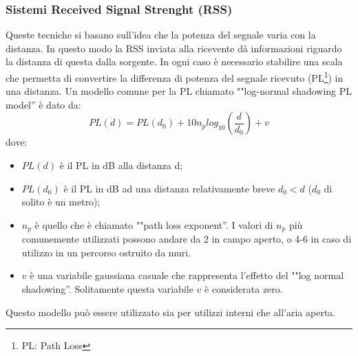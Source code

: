 \subsubsection{Sistemi Received Signal Strenght (RSS)}
Queste tecniche si basano sull'idea che la potenza del segnale varia con la distanza. In questo modo la RSS inviata alla ricevente dà informazioni riguardo la distanza di questa dalla sorgente. In ogni caso è necessario stabilire una scala che permetta di convertire la differenza di potenza del segnale ricevuto (PL\footnote{PL: Path Loss}) in una distanza. Un modello comune per la PL chiamato ""log-normal shadowing PL model'' è dato da:
 $$ PL\left(d\right) = PL\left(d_0\right) + 10n_plog_{10} \left( \frac{d}{d_0} \right) + v $$
dove:
\begin{itemize}
\item $ PL(d) $ è il PL in dB alla distanza d; 
\item $ PL(d_0) $ è il PL in dB ad una distanza relativamente breve $ d_0 < d $ ($ d_{0} $ di solito è un metro); 
\item $n_p$ è quello che è chiamato ""path loss exponent''. I valori di $n_p$ più comunemente utilizzati possono andare da 2 in campo aperto, o 4-6 in caso di utilizzo in un percorso ostruito da muri.
\item $v$ è una variabile gaussiana casuale che rappresenta l'effetto del ""log normal shadowing''. Solitamente questa variabile $v$ è considerata zero. 
\end{itemize}
Questo modello può essere utilizzato sia per utilizzi interni che all'aria aperta. 

